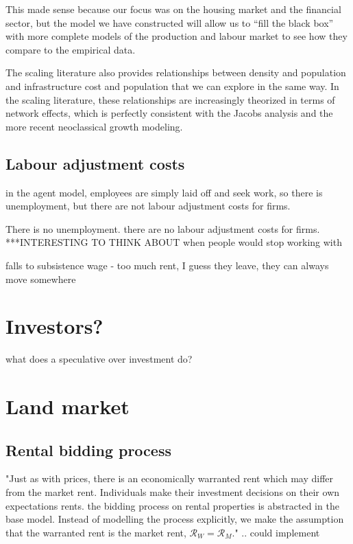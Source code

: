 This made sense because our focus  was on the housing market and the financial sector, but the model we have constructed will allow us to ``fill the black box'' with more complete models of the production and labour market to see how they compare to the empirical data. 

The scaling literature also provides relationships between density and population and infrastructure cost and population that we can explore in the same way. In the scaling literature, these relationships are increasingly theorized in terms of network effects, which is perfectly consistent with the Jacobs analysis and the more recent neoclassical growth modeling.


\subsection{Labour adjustment costs}

in the agent model, employees are simply laid off and seek work, so there is unemployment, but there are not \glspl{labour adjustment cost} for firms.

There is no unemployment. there are no labour adjustment costs for firms. ***INTERESTING TO THINK ABOUT  
when people would stop working with

 falls to subsistence wage -
 too much rent, I guess they leave, they can always move somewhere


\section{Investors?}

what does a speculative over investment do? 


\section{Land market}

\subsection{Rental bidding process}
 "Just as with prices, there is an economically \gls{warranted rent} which may differ from the \gls{market rent}. Individuals make their investment decisions on their own expectations rents. the bidding process on rental properties is abstracted in the base model. Instead of modelling the process explicitly, we make the assumption that the warranted rent is the market rent, $\mathcal{R}_W = \mathcal{R}_M$." .. could implement


